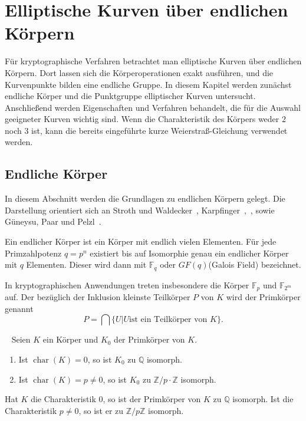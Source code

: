 \chapter{Elliptische Kurven über endlichen Körpern}
Für kryptographische Verfahren betrachtet man elliptische Kurven über endlichen Körpern. Dort lassen sich die Körperoperationen exakt ausführen, und die Kurvenpunkte bilden eine endliche Gruppe. In diesem Kapitel werden zunächst endliche Körper und die Punktgruppe elliptischer Kurven untersucht. Anschließend werden Eigenschaften und Verfahren behandelt, die für die Auswahl geeigneter Kurven wichtig sind. Wenn die Charakteristik des Körpers weder $2$ noch $3$ ist, kann die bereits eingeführte kurze Weierstraß-Gleichung verwendet werden.
\section{Endliche Körper}
In diesem Abschnitt werden die Grundlagen zu endlichen Körpern gelegt. Die Darstellung orientiert sich an Stroth und Waldecker~\cite[S.~66--67, 163--164]{stroth24}, Karpfinger~\cite[S.~46, 317--318, 391--392]{karpf24},~\cite[S.~230]{omondi20}, sowie Güneysu, Paar und Pelzl~\cite[S.~279~f.]{guneysu24}.
\begin{definition}
    Ein endlicher Körper ist ein Körper mit endlich vielen Elementen. Für jede Primzahlpotenz \(q=p^n\) existiert bis auf Isomorphie genau ein endlicher Körper mit \(q\) Elementen. Dieser wird dann mit \(\mathbb F_q\) oder \(GF(q)\)(Galois Field) bezeichnet.
\end{definition}
In kryptographischen Anwendungen treten insbesondere die Körper \(\mathbb F_p\) und \(\mathbb F_{2^m}\) auf. Der bezüglich der Inklusion kleinste Teilkörper  $P$ von $K$ wird der Primkörper genannt
\[
    P=\bigcap \{U|U \text{ist ein Teilkörper von }K\}.
\]
\begin{satz}~\label{hilfs:primkörper}
    Seien $K$ ein Körper und $K_0$ der Primkörper von $K$.
    \begin{enumerate}
        \item Ist \(\operatorname{char}(K)=0\), so ist $K_0$ zu $\mathbb{Q}$ isomorph.
        \item Ist \(\operatorname{char}(K)=p\neq 0\), so ist $K_0$ zu $\mathbb{Z}/p\cdot \mathbb{Z}$ isomorph.
    \end{enumerate}
\end{satz}
Hat $K$ die Charakteristik $0$, so ist der Primkörper von $K$ zu $\mathbb{Q}$ isomorph. Ist die Charakteristik $p \neq 0$, so ist er zu $\mathbb{Z}/p\mathbb{Z}$ isomorph.
